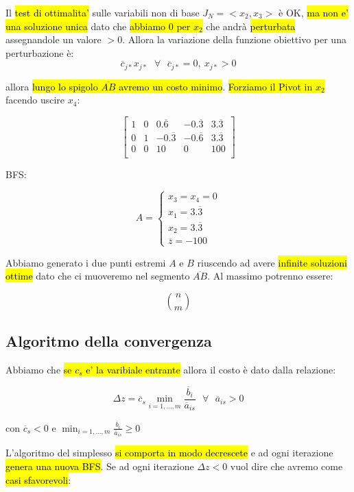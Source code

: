 Il \hl{test di ottimalita'} sulle variabili non di base $J_N = <x_2, x_3>$ è OK, \hl{ma non e' una soluzione unica} dato che \hl{abbiamo $0$ per $x_2$} che andrà \hl{perturbata} assegnandole un valore $> 0$. Allora la variazione della funzione obiettivo per una perturbazione è:
$$\overline{c}_{j*}x_{j*}\ \ \ \forall\ \ \ \overline{c}_{j*}=0,\ x_{j*} > 0$$

allora \hl{lungo lo spigolo $\overline{AB}$ avremo un costo minimo}. \hl{Forziamo il Pivot in $x_2$} facendo uscire $x_4$:

$$
\left[ {\begin{array}{ccccc}
	1 & 0 & 0.\overline{6} & -0.\overline{3} & 3.\overline{3}\\
	0 & 1 & -0.\overline{3} & -0.\overline{6} & 3.\overline{3}\\
	0 & 0 & 10 & 0 & 100\\
\end{array} } \right]
$$

BFS:


$$A =
\begin{cases} 
    x_3 = x_4 = 0 \\ 
    x_1 = 3.\overline{3} \\
	x_2 = 3.\overline{3} \\
	\overline{z} = -100
\end{cases}
$$

Abbiamo generato i due punti estremi $A$ e $B$ riuscendo ad avere \hl{infinite soluzioni ottime} dato che ci muoveremo nel segmento $\overline{AB}$. Al massimo potrenno essere:

$$\binom{n}{m}$$ 


\subsection{Algoritmo della convergenza}

Abbiamo che \hl{se $c_s$ e' la varibiale entrante} allora il costo è dato dalla relazione:

$$\Delta z = \overline{c}_s \min_{i = 1, ..., m}\frac{\overline{b}_i}{\overline{a}_{is}}\ \ \ \forall\ \ \ \overline{a}_{is} > 0$$

con $\overline{c}_s < 0$ e $\min_{i = 1, ..., m}\frac{\overline{b}_i}{\overline{a}_{is}} \geq 0$


L'algoritmo del simplesso \hl{si comporta in modo decrescete} e ad ogni iterazione \hl{genera una nuova BFS}. Se ad ogni iterazione $\Delta z < 0$ vuol dire che avremo come \hl{casi sfavorevoli}:

